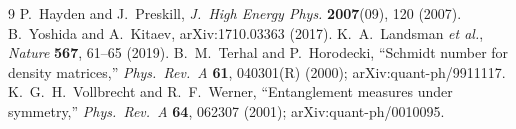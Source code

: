 \documentclass[11pt,twocolumn]{article}
\begin{document}
\begin{thebibliography}{9}
 P.~Hayden and J.~Preskill, \emph{J.~High Energy Phys.} \textbf{2007}(09), 120 (2007).
 B.~Yoshida and A.~Kitaev, arXiv:1710.03363 (2017).
 K.~A.~Landsman \emph{et al.}, \emph{Nature} \textbf{567}, 61--65 (2019).
 B.~M.~Terhal and P.~Horodecki, ``Schmidt number for density matrices,'' \emph{Phys.\ Rev.\ A} \textbf{61}, 040301(R) (2000); arXiv:quant-ph/9911117.
 K.~G.~H.~Vollbrecht and R.~F.~Werner, ``Entanglement measures under symmetry,'' \emph{Phys.\ Rev.\ A} \textbf{64}, 062307 (2001); arXiv:quant-ph/0010095.
\end{thebibliography}
\end{document}
